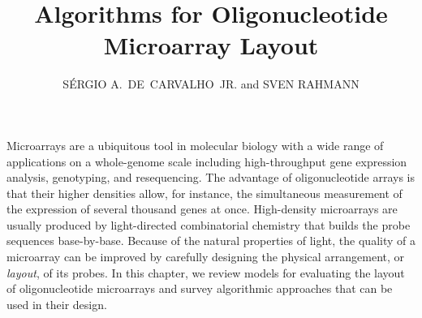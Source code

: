 \documentclass{w-edbk}
\begin{document}


\title[Algorithms for Microarray Layout]{Algorithms for Oligonucleotide Microarray Layout}


\author[S\'ergio A.~de~Carvalho~Jr. and Sven Rahmann]{S\'ERGIO A.~DE~CARVALHO~JR. and SVEN RAHMANN}







Microarrays are a ubiquitous tool in molecular biology with a
wide range of applications on a whole-genome scale including
high-throughput gene expression analysis, genotyping, and resequencing.
The advantage of oligonucleotide arrays is that their higher densities
allow, for instance, the simultaneous measurement of the expression of
several thousand genes at once. High-density microarrays are usually
produced by light-directed combinatorial chemistry that builds the
probe sequences base-by-base. Because of the natural properties of
light, the quality of a microarray can be improved by carefully
designing the physical arrangement, or \emph{layout}, of its probes.
In this chapter, we review models for evaluating the layout of
oligonucleotide microarrays and survey algorithmic approaches
that can be used in their design.
\end{document}
